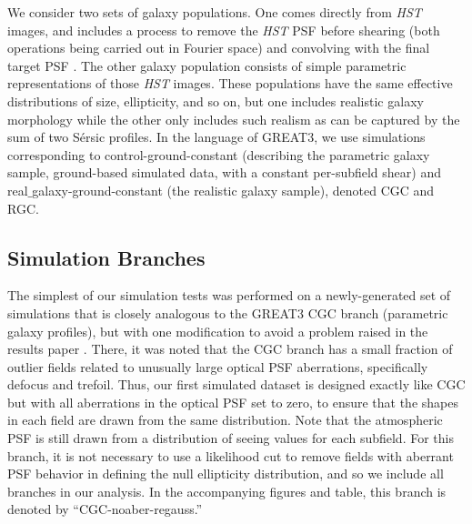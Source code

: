 \documentclass[iop]{emulateapj}
\newcommand\rmcomment[1]{\textcolor{red}{(RM: #1)}}
\begin{document}

We consider two sets of galaxy populations.  One comes directly from
{\it HST} images, and includes a process to remove the {\it HST} PSF before
shearing (both operations being carried out in Fourier space) and
convolving with the final target PSF \citep{2012MNRAS.420.1518M}.  The
other galaxy population consists of simple parametric representations
of those {\it HST} images.  These populations have the same effective
distributions of size, ellipticity, and so on, but one includes
realistic galaxy morphology while the other only includes such realism
as can be captured by the sum of two S\'{e}rsic profiles.  In the
language of GREAT3, we use simulations corresponding to
control-ground-constant (describing the parametric galaxy sample,
ground-based simulated data, with a constant per-subfield shear) and
real$\_$galaxy-ground-constant (the realistic galaxy sample), denoted
CGC and RGC.

\subsection{Simulation Branches}
\label{sec:branches}

The simplest of our simulation tests was performed on a
newly-generated set of simulations that is closely analogous to the
GREAT3 CGC branch (parametric galaxy profiles), but with one
modification to avoid a problem raised in the results paper
\citep{2015MNRAS.450.2963M}.  There, it was noted that the CGC branch
has a small fraction of outlier fields related to unusually large
optical PSF aberrations, specifically defocus and trefoil.  Thus, our
first simulated dataset is designed exactly like CGC but with all
aberrations in the optical PSF set to zero, to ensure that the shapes
in each field are drawn from the same distribution.  Note that
the atmospheric PSF is still drawn from a distribution of seeing
values for each subfield. For this branch, it is not necessary to use
a likelihood cut to remove fields with aberrant PSF behavior in
defining the null ellipticity distribution, and so we include all
branches in our analysis. In the accompanying figures and table, this
branch is denoted by ``CGC-noaber-regauss.''
\end{document}
